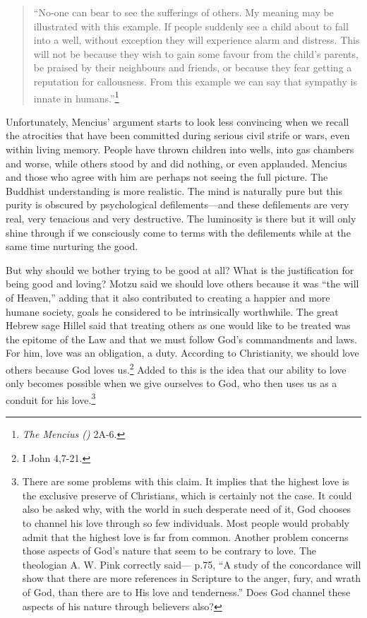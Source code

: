 \documentclass[10pt, openright]{book}
\begin{document}
\begin{quote}


“No-one can bear to see the sufferings of others. My meaning may be illustrated with this example. If people suddenly see a child about to fall into a well, without exception they will experience alarm and distress. This will not be because they wish to gain some favour from the child’s parents, be praised by their neighbours and friends, or because they fear getting a reputation for callousness. From this example we can say that sympathy is innate in humans.”\footnote {\textit{The Mencius (\cite{Mencius 1970a})} 2A-6.}




\end{quote}
Unfortunately, Mencius’ argument starts to look less convincing when we recall the atrocities that have been committed during serious civil strife or wars, even within living memory. People have thrown children into wells, into gas chambers and worse, while others stood by and did nothing, or even applauded. Mencius and those who agree with him are perhaps not seeing the full picture. The Buddhist understanding is more realistic. The mind is naturally pure but this purity is obscured by psychological defilements—and these defilements are very real, very tenacious and very destructive. The luminosity is there but it will only shine through if we consciously come to terms with the defilements while at the same time nurturing the good.


But why should we bother trying to be good at all? What is the justification for being good and loving? Motzu said we should love others because it was “the will of Heaven,” adding that it also contributed to creating a happier and more humane society, goals he considered to be intrinsically worthwhile. The great Hebrew sage Hillel said that treating others as one would like to be treated was the epitome of the Law and that we must follow God’s commandments and laws. For him, love was an obligation, a duty. According to Christianity, we should love others because God loves us.\footnote {I John 4,7-21.} Added to this is the idea that our ability to love only becomes possible when we give ourselves to God, who then uses us as a conduit for his love.\footnote {There are some problems with this claim. It implies that the highest love is the exclusive preserve of Christians, which is certainly not the case. It could also be asked why, with the world in such desperate need of it, God chooses to channel his love through so few individuals. Most people would probably admit that the highest love is far from common. Another problem concerns those aspects of God’s nature that seem to be contrary to love. The theologian A. W. Pink correctly said—\cite{Pink 1968} p.75, “A study of the concordance will show that there are more references in Scripture to the anger, fury, and wrath of God, than there are to His love and tenderness.” Does God channel these aspects of his nature through believers also?}
\end{document}
